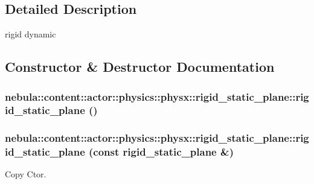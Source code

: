 \subsection{Detailed Description}
rigid dynamic 

\subsection{Constructor \& Destructor Documentation}
\hypertarget{classnebula_1_1content_1_1actor_1_1physics_1_1physx_1_1rigid__static__plane_abb60e005401fff6b0e8dda22e719ec5e}{
\subsubsection[{rigid\_\-static\_\-plane}]{\setlength{\rightskip}{0pt plus 5cm}nebula::content::actor::physics::physx::rigid\_\-static\_\-plane::rigid\_\-static\_\-plane ()}}
\label{classnebula_1_1content_1_1actor_1_1physics_1_1physx_1_1rigid__static__plane_abb60e005401fff6b0e8dda22e719ec5e}
\hypertarget{classnebula_1_1content_1_1actor_1_1physics_1_1physx_1_1rigid__static__plane_ab5177db753f31243971615cacfa67060}{
\subsubsection[{rigid\_\-static\_\-plane}]{\setlength{\rightskip}{0pt plus 5cm}nebula::content::actor::physics::physx::rigid\_\-static\_\-plane::rigid\_\-static\_\-plane (const {\bf rigid\_\-static\_\-plane} \&)}}
\label{classnebula_1_1content_1_1actor_1_1physics_1_1physx_1_1rigid__static__plane_ab5177db753f31243971615cacfa67060}


Copy Ctor. 

